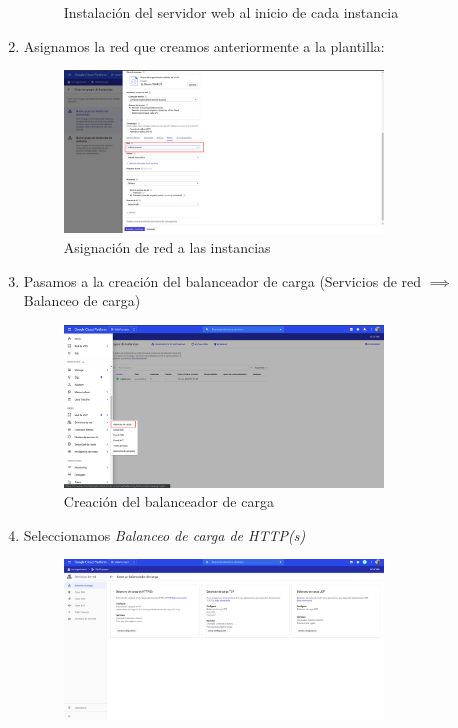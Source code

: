 \documentclass[12pt,spanish]{article}
\begin{document}
\begin{enumerate}
\begin{figure}[H]
		\caption{Instalación del servidor web al inicio de cada instancia}
	\end{figure}
	\newpage
	\item Asignamos la red que creamos anteriormente a la plantilla:
	\begin{figure}[H]
		\centering
		\includegraphics[width=0.8\textwidth]{project/network.png}
		\caption{Asignación de red a las instancias}
	\end{figure}
	\item Pasamos a la creación del balanceador de carga (Servicios de red $\implies$ Balanceo de carga)
	\begin{figure}[H]
		\centering
		\includegraphics[width=0.8\textwidth]{project/loadbalancer.png}
		\caption{Creación del balanceador de carga}
	\end{figure}
	\newpage
	\item Seleccionamos \emph{Balanceo de carga de HTTP(s)}
	\begin{figure}[H]
		\centering
		\includegraphics[width=0.8\textwidth]{project/loadbalancerhttps.png}

\end{figure}
\end{enumerate}
\end{document}
